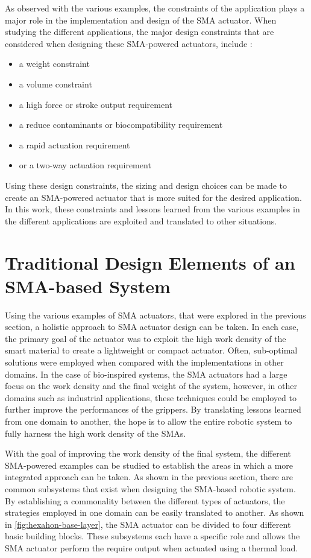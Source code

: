 As observed with the various examples, the constraints of the application plays a major role in the implementation and design of the SMA actuator. When studying the different applications, the major design constraints that are considered when designing these SMA-powered actuators, include :
\begin{itemize}
    \item a weight constraint
    \item a volume constraint
    \item a high force or stroke output requirement
    \item a reduce contaminants or biocompatibility requirement
    \item a rapid actuation requirement
    \item or a two-way actuation requirement
\end{itemize}
Using these design constraints, the sizing and design choices can be made to create an SMA-powered actuator that is more suited for the desired application. In this work, these constraints and lessons learned from the various examples in the different applications are exploited and translated to other situations.

\section{Traditional Design Elements of an SMA-based System}
Using the various examples of SMA actuators, that were explored in the previous section, a holistic approach to SMA actuator design can be taken. In each case, the primary goal of the actuator was to exploit the high work density of the smart material to create a lightweight or compact actuator. Often, sub-optimal solutions were employed when compared with the implementations in other domains. In the case of bio-inspired systems, the SMA actuators had a large focus on the work density and the final weight of the system, however, in other domains such as industrial applications, these techniques could be employed to further improve the performances of the grippers. By translating lessons learned from one domain to another, the hope is to allow the entire robotic system to fully harness the high work density of the SMAs.

With the goal of improving the work density of the final system, the different SMA-powered examples can be studied to establish the areas in which a more integrated approach can be taken. As shown in the previous section, there are common subsystems that exist when designing the SMA-based robotic system. By establishing a commonality between the different types of actuators, the strategies employed in one domain can be easily translated to another. As shown in \cref{fig:hexahon-base-layer}, the SMA actuator can be divided to four different basic building blocks. These subsystems each have a specific role and allows the SMA actuator perform the require output when actuated using a thermal load.

